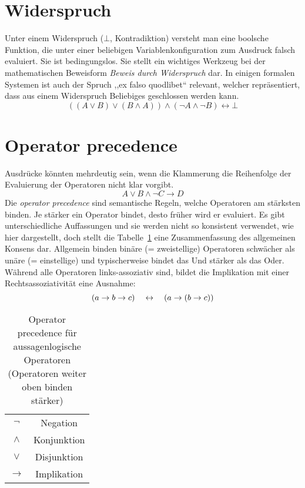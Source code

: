 \section{Widerspruch}
%
Unter einem Widerspruch ($\bot$, Kontradiktion) versteht man eine boolsche Funktion, die unter einer beliebigen Variablenkonfiguration zum Ausdruck falsch evaluiert. Sie ist bedingungslos. Sie stellt ein wichtiges Werkzeug bei der mathematischen Beweisform \emph{Beweis durch Widerspruch} dar. In einigen formalen Systemen ist auch der Spruch ,,ex falso quodlibet`` relevant, welcher repräsentiert, dass aus einem Widerspruch Beliebiges geschlossen werden kann.
%
\begin{equation}
  ((A \lor B) \lor (B \land A)) \land (\neg A \land \neg B) \leftrightarrow \bot
\end{equation}

\section{Operator precedence}
%
Ausdrücke könnten mehrdeutig sein, wenn die Klammerung die Reihenfolge der Evaluierung der Operatoren nicht klar vorgibt.
%
\[
  A \lor B \land \neg C \rightarrow D
\]
%
Die \emph{operator precedence} sind semantische Regeln, welche Operatoren am stärksten binden. Je stärker ein Operator bindet, desto früher wird er evaluiert. Es gibt unterschiedliche Auffassungen und sie werden nicht so konsistent verwendet, wie hier dargestellt, doch stellt die Tabelle~\ref{tab:op_precedence} eine Zusammenfassung des allgemeinen Konsens dar. Allgemein binden binäre (= zweistellige) Operatoren schwächer als unäre (= einstellige) und typischerweise bindet das Und stärker als das Oder. Während alle Operatoren links-assoziativ sind, bildet die Implikation mit einer Rechtsassoziativität eine Ausnahme:
\begin{equation}
  (a \rightarrow b \rightarrow c) \quad\leftrightarrow\quad (a \rightarrow (b \rightarrow c))
\end{equation}

\begin{table}[ht]
 \begin{center}
  \begin{tabular}{cc}
   $\neg$        & Negation \\
   $\land$       & Konjunktion \\
   $\lor$        & Disjunktion \\
   $\rightarrow$ & Implikation
  \end{tabular}
  \caption{Operator precedence für aussagenlogische Operatoren
           (Operatoren weiter oben binden stärker)}
  \label{tab:op_precedence}
 \end{center}
\end{table}


